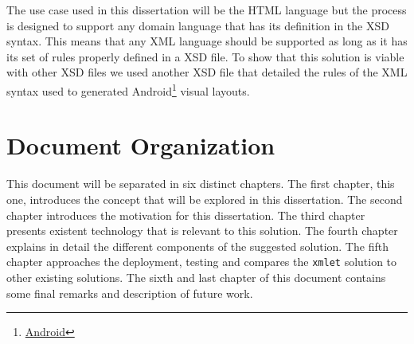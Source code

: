 \noindent
The use case used in this dissertation will be the \ac{HTML} language but the process is designed to support any domain language that has its definition in the \ac{XSD} syntax. This means that any \ac{XML} language should be supported as long as it has its set of rules properly defined in a \ac{XSD} file. To show that this solution is viable with other \ac{XSD} files we used another \ac{XSD} file that detailed the rules of the \ac{XML} syntax used to generated Android\footnote{\href{https://www.android.com/}{Android}} visual layouts.

\section{Document Organization}

This document will be separated in six distinct chapters. The first chapter, this one, introduces the concept that will be explored in this dissertation. The second chapter introduces the motivation for this dissertation. The third chapter presents existent technology that is relevant to this solution. The fourth chapter explains in detail the different components of the suggested solution. The fifth chapter approaches the deployment, testing and compares the \texttt{xmlet} solution to other existing solutions. The sixth and last chapter of this document contains some final remarks and description of future work.